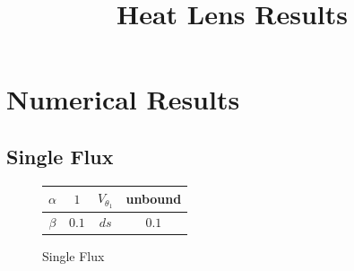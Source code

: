 \documentclass[11pt]{article}
\title{Heat Lens Results}
\date{}
\begin{document}
\maketitle

\tableofcontents

\pagebreak
\section{Numerical Results}
\subsection{Single Flux}
\begin{figure}[!h]
    \centering
    \begin{tabular}{|c|c||c|c|}\hline
    $\alpha$ & $1$ & $V_{\theta_1}$ & unbound \\\hline
    $\beta$ & $0.1$ & $ds$ & $0.1$ \\\hline
    \end{tabular}
    \caption{Single Flux}
\end{figure}
\end{document}
